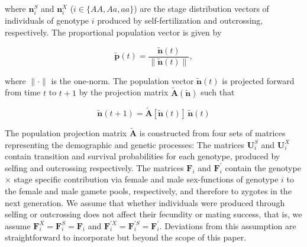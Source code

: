 \documentclass[11pt]{article}
\def\mbf#1{\mathbf{#1}}
\begin{document}
\noindent where $\mbf{n}^{S}_{i}$ and $\mbf{n}^{X}_{i}$ ($i \in \{AA,Aa,aa\}$) are the stage distribution vectors of individuals of genotype $i$ produced by self-fertilization and outcrossing, respectively. The proportional population vector is given by
\begin{linenomath*}
\begin{equation} \label{eq:propPopVec}
	\tilde{\mbf{p}}(t) = \frac{\tilde{\mbf{n}}(t)}{ \| \tilde{\mbf{n}}(t) \|},
\end{equation}
\end{linenomath*}

\noindent where $\| \cdot \|$ is the one-norm. The population vector $\tilde{\mbf{n}}(t)$ is projected forward from time $t$ to $t + 1$ by the projection matrix $\tilde{\mbf{A}}(\tilde{\mbf{n}})$ such that 
\begin{linenomath*}
\begin{equation}
	\tilde{\mbf{n}}(t + 1) = \tilde{\mbf{A}}[\tilde{\mbf{n}}(t)] \, \tilde{\mbf{n}}(t)
\end{equation}
\end{linenomath*}

The population projection matrix $\tilde{\mbf{A}}$ is constructed from four sets of matrices representing the demographic and genetic processes: The matrices $\mbf{U}^{S}_{i}$ and $\mbf{U}^{X}_{i}$ contain transition and survival probabilities for each genotype, produced by selfing and outcrossing respectively. The matrices $\mbf{F}_{i}$ and $\mbf{F}^{\prime}_{i}$ contain the genotype $\times$ stage specific contribution via female and male sex-functions of genotype $i$ to the female and male gamete pools, respectively, and therefore to zygotes in the next generation. We assume that whether individuals were produced through selfing or outcrossing does not affect their fecundity or mating success, that is, we assume  $\mbf{F}^X_{i}=\mbf{F}^S_{i}=\mbf{F}_{i}$ and $\mbf{F}^{\prime X}_{i}=\mbf{F}^{\prime S}_{i}=\mbf{F}^{\prime}_{i}$. Deviations from this assumption are straightforward to incorporate but beyond the scope of this paper. 
\end{document}
